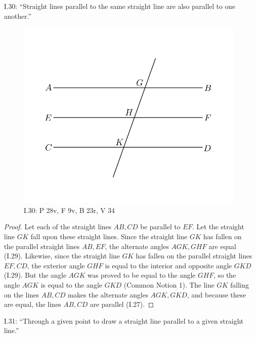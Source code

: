 \documentclass{article}
\begin{document}
I.30: ``Straight lines parallel to the same straight line are also
parallel to one another.''

\begin{figure}
\begin{center}
\includegraphics{I30.png}
\end{center}
\caption{I.30: P 28v, F 9v, B 23r, V 34}
\label{I30}
\end{figure}

\begin{proof}
Let each of the straight lines $AB,CD$ be parallel to $EF$. 
Let the straight line $GK$ fall upon these straight lines.
Since the straight line $GK$ has fallen on the parallel straight lines $AB,EF$,
the alternate angles $AGK,GHF$ are equal (I.29).
Likewise, since the straight line $GK$ has fallen on the parallel straight lines $EF,CD$,
the exterior angle $GHF$ is equal to the interior and opposite angle $GKD$ (I.29).
But the angle $AGK$ was proved to be equal to the angle $GHF$, so
the angle $AGK$ is equal to the angle $GKD$ (Common Notion 1).
The line $GK$ falling on the lines $AB,CD$ makes the alternate angles $AGK,GKD$, and because these are equal,
the lines $AB,CD$ are parallel (I.27).
\end{proof}


I.31: ``Through a given point to draw a straight line parallel to a 
given straight line.''
\end{document}
